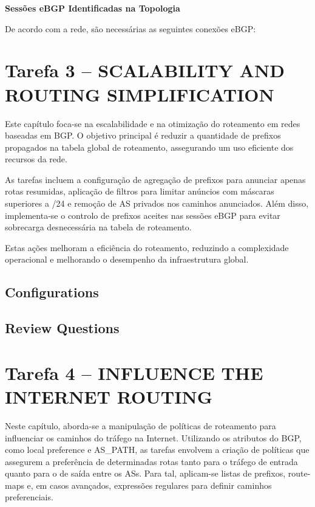 \documentclass[11pt,english, openright, oneside]{book}
\begin{document}
\pagebreak
\textbf{Sessões eBGP Identificadas na Topologia} \par
\vspace{0.2cm}
De acordo com a rede, são necessárias as seguintes conexões eBGP: \vspace{0.2cm}


\section{Tarefa 3 -- SCALABILITY AND ROUTING SIMPLIFICATION}
\vspace{0.2cm}

Este capítulo foca-se na escalabilidade e na otimização do roteamento em redes baseadas em BGP. O objetivo principal é reduzir a quantidade de prefixos propagados na tabela global de roteamento, assegurando um uso eficiente dos recursos da rede. 

As tarefas incluem a configuração de agregação de prefixos para anunciar apenas rotas resumidas, aplicação de filtros para limitar anúncios com máscaras superiores a /24 e remoção de AS privados nos caminhos anunciados. Além disso, implementa-se o controlo de prefixos aceites nas sessões eBGP para evitar sobrecarga desnecessária na tabela de roteamento. 

Estas ações melhoram a eficiência do roteamento, reduzindo a complexidade operacional e melhorando o desempenho da infraestrutura global.

\vspace{0.4cm}
\subsection{Configurations}
\vspace{0.2cm}

\subsection{Review Questions}
\vspace{0.2cm}



\pagebreak
\section{Tarefa 4 -- INFLUENCE THE INTERNET ROUTING}
\vspace{0.2cm}

Neste capítulo, aborda-se a manipulação de políticas de roteamento para influenciar os caminhos do tráfego na Internet. Utilizando os atributos do BGP, como local preference e AS\_PATH, as tarefas envolvem a criação de políticas que assegurem a preferência de determinadas rotas tanto para o tráfego de entrada quanto para o de saída entre os ASs. Para tal, aplicam-se listas de prefixos, route-maps e, em casos avançados, expressões regulares para definir caminhos preferenciais. 
\end{document}
